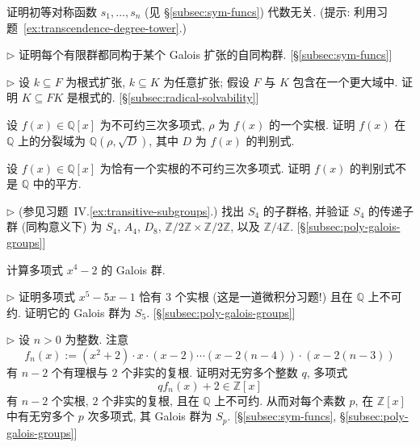 \begin{prob}\label{ex:elementary-symmetric-independent}
证明初等对称函数 $s_1,\ldots,s_n$ (见 §\ref{subsec:sym-funcs}) 代数无关. (提示: 利用习题~\ref{ex:transcendence-degree-tower}.)
\end{prob}

\begin{prob}\label{ex:every-finite-group-galois}
$\triangleright$ 证明每个有限群都同构于某个 Galois 扩张的自同构群. [§\ref{subsec:sym-funcs}]
\end{prob}

\begin{prob}\label{ex:radical-composite}
$\triangleright$ 设 $k\subseteq F$ 为根式扩张, $k\subseteq K$ 为任意扩张; 假设 $F$ 与 $K$ 包含在一个更大域中. 证明 $K\subseteq FK$ 是根式的. [§\ref{subsec:radical-solvability}]
\end{prob}

\begin{prob}\label{ex:cubic-splitting-Qp}
设 $f(x)\in\mathbb{Q}[x]$ 为不可约三次多项式, $\rho$ 为 $f(x)$ 的一个实根. 证明 $f(x)$ 在 $\mathbb{Q}$ 上的分裂域为 $\mathbb{Q}(\rho,\sqrt{D})$, 其中 $D$ 为 $f(x)$ 的判别式.
\end{prob}

\begin{prob}\label{ex:cubic-one-real-discriminant}
设 $f(x)\in\mathbb{Q}[x]$ 为恰有一个实根的不可约三次多项式. 证明 $f(x)$ 的判别式不是 $\mathbb{Q}$ 中的平方.
\end{prob}

\begin{prob}\label{ex:s4-transitive-subgroups}
$\triangleright$ (参见习题~IV.\ref{ex:transitive-subgroups}.) 找出 $S_4$ 的子群格, 并验证 $S_4$ 的传递子群 (同构意义下) 为 $S_4$, $A_4$, $D_8$, $\mathbb{Z}/2\mathbb{Z}\times\mathbb{Z}/2\mathbb{Z}$, 以及 $\mathbb{Z}/4\mathbb{Z}$. [§\ref{subsec:poly-galois-groups}]
\end{prob}

\begin{prob}\label{ex:galois-x4-2}
计算多项式 $x^4-2$ 的 Galois 群.
\end{prob}

\begin{prob}\label{ex:x5-5x-1-s5}
$\triangleright$ 证明多项式 $x^5-5x-1$ 恰有 $3$ 个实根 (这是一道微积分习题!) 且在 $\mathbb{Q}$ 上不可约. 证明它的 Galois 群为 $S_5$. [§\ref{subsec:poly-galois-groups}]
\end{prob}

\begin{prob}\label{ex:prime-degree-sp-infinite}
$\triangleright$ 设 $n>0$ 为整数. 注意
\[
f_n(x):=(x^2+2)\cdot x\cdot(x-2)\cdots(x-2(n-4))\cdot(x-2(n-3))
\]
有 $n-2$ 个有理根与 $2$ 个非实的复根. 证明对无穷多个整数 $q$, 多项式
\[
qf_n(x)+2\in\mathbb{Z}[x]
\]
有 $n-2$ 个实根, $2$ 个非实的复根, 且在 $\mathbb{Q}$ 上不可约. 从而对每个素数 $p$, 在 $\mathbb{Z}[x]$ 中有无穷多个 $p$ 次多项式, 其 Galois 群为 $S_p$. [§\ref{subsec:sym-funcs}, §\ref{subsec:poly-galois-groups}]
\end{prob}

